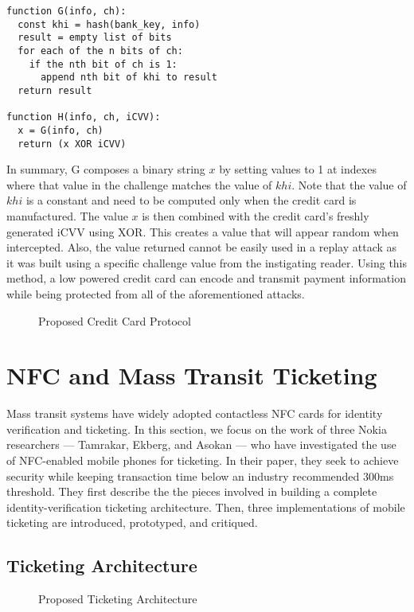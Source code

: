\documentclass{sig-alternate}
\begin{document}
\begin{lstlisting}
function G(info, ch):
  const khi = hash(bank_key, info)
  result = empty list of bits
  for each of the n bits of ch:
    if the nth bit of ch is 1:
      append nth bit of khi to result
  return result

function H(info, ch, iCVV):
  x = G(info, ch)
  return (x XOR iCVV)
\end{lstlisting}

In summary, G composes a binary string $x$ by setting values to 1 at indexes where that value in the challenge matches the value of $khi$. Note that the value of $khi$ is a constant and need to be computed only when the credit card is manufactured. The value $x$ is then combined with the credit card's freshly generated iCVV using XOR. This creates a value that will appear random when intercepted. Also, the value returned cannot be easily used in a replay attack as it was built using a specific challenge value from the instigating reader. Using this method, a low powered credit card can encode and transmit payment information while being protected from all of the aforementioned attacks.

\begin{figure}
\centering
{}
\caption{Proposed Credit Card Protocol~\cite{CC2016}}
\label{fig:secureCC}
\end{figure}


\section{NFC and Mass Transit Ticketing}
\label{sec:mobile}

Mass transit systems have widely adopted contactless NFC cards for identity verification and ticketing. In this section, we focus on the work of three Nokia researchers --- Tamrakar, Ekberg, and Asokan --- who have investigated the use of NFC-enabled mobile phones for ticketing. In their paper, they seek to achieve security while keeping transaction time below an industry recommended 300ms threshold.
They first describe the the pieces involved in building a complete identity-verification ticketing architecture. Then, three implementations of mobile ticketing are introduced, prototyped, and critiqued.~\cite{Ticket2011}

\subsection{Ticketing Architecture}
\begin{figure}
\centering
{}
\caption{Proposed Ticketing Architecture~\cite{Ticket2011}}
\label{fig:ticketingArch}
\end{figure}
\end{document}
